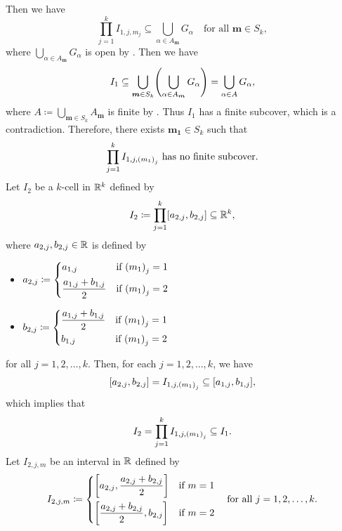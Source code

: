     Then we have
    \[
    \prod_{j = 1}^{k} I_{1, j, m_{j}} \subseteq \bigcup_{\alpha \in A_{\bm{m}}} G_{\alpha}
    \quad \text{for all } \bm{m} \in S_{k},
    \]
    where $\displaystyle \bigcup_{\alpha \in A_{\bm{m}}} G_{\alpha}$ is open by .
    Then we have
    \[
    I_{1} \subseteq \bigcup_{\bm{m} \in S_{k}} \paren*{\bigcup_{\alpha \in A_{\bm{m}}} G_{\alpha}}
    = \bigcup_{\alpha \in A} G_{\alpha},
    \]
    where $A \coloneqq \displaystyle \bigcup_{\bm{m} \in S_{k}} A_{\bm{m}}$ is finite by
    . Thus $I_{1}$ has a finite subcover, which is a contradiction.
    Therefore, there exists $\bm{m_{1}} \in S_{k}$ such that
    \[
    \prod_{j = 1}^{k} I_{1, j, \paren*{m_{1}}_{j}} \text{ has no finite subcover}.
    \]
    Let $I_{2}$ be a $k$-cell in $\R^{k}$ defined by
    \[
    I_{2} \coloneqq \prod_{j = 1}^{k} \bracket{a_{2, j}, b_{2, j}} \subseteq \R^{k},
    \]
    where $a_{2, j}, b_{2, j} \in \R$ is defined by
    \begin{itemize}
        \item $a_{2, j} \coloneqq \begin{dcases}
            a_{1, j} & \text{if } \paren*{m_{1}}_{j} = 1 \\
            \frac{a_{1, j} + b_{1, j}}{2} & \text{if } \paren*{m_{1}}_{j} = 2
        \end{dcases}$
        \item $b_{2, j} \coloneqq \begin{dcases}
            \frac{a_{1, j} + b_{1, j}}{2} & \text{if } \paren*{m_{1}}_{j} = 1 \\
            b_{1, j} & \text{if } \paren*{m_{1}}_{j} = 2
        \end{dcases}$
    \end{itemize}
    for all $j = 1, 2, \dots, k$. Then, for each $j = 1, 2, \dots, k$, we have
    \[
    \bracket{a_{2, j}, b_{2, j}} = I_{1, j, \paren*{m_{1}}_{j}} \subseteq \bracket{a_{1, j}, b_{1, j}},
    \]
    which implies that
    \[
    I_{2} = \prod_{j = 1}^{k} I_{1, j, \paren*{m_{1}}_{j}} \subseteq I_{1}.
    \]
    Let $I_{2, j, m}$ be an interval in $\R$ defined by
    \[
    I_{2, j, m} \coloneqq \begin{dcases}
        \bracket*{a_{2, j}, \frac{a_{2, j} + b_{2, j}}{2}} & \text{if } m = 1 \\
        \bracket*{\frac{a_{2, j} + b_{2, j}}{2}, b_{2, j}} & \text{if } m = 2
    \end{dcases} \quad \text{for all } j = 1, 2, \dots, k.
    \]
